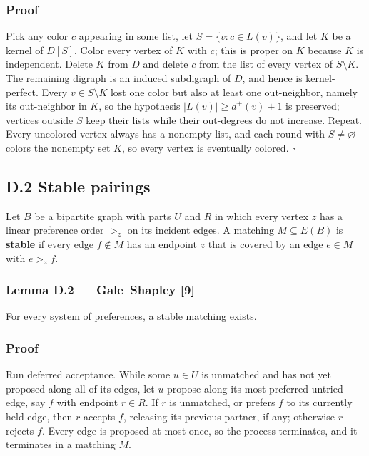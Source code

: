 \documentclass[english,11pt,a4paper]{article}
\newcounter{none}
\begin{document}
\subsubsection{Proof}\label{proof-9}

Pick any color \(c\) appearing in some list, let \(S=\{v:c\in L(v)\}\),
and let \(K\) be a kernel of \(D[S]\). Color every vertex of \(K\) with
\(c\); this is proper on \(K\) because \(K\) is independent. Delete
\(K\) from \(D\) and delete \(c\) from the list of every vertex of
\(S\setminus K\). The remaining digraph is an induced subdigraph of
\(D\), and hence is kernel-perfect. Every \(v\in S\setminus K\) lost one
color but also at least one out-neighbor, namely its out-neighbor in
\(K\), so the hypothesis \(|L(v)|\ge d^+(v)+1\) is preserved; vertices
outside \(S\) keep their lists while their out-degrees do not increase.
Repeat. Every uncolored vertex always has a nonempty list, and each
round with \(S\ne\varnothing\) colors the nonempty set \(K\), so every
vertex is eventually colored. \(\square\)

\subsection{D.2 Stable pairings}\label{d.2-stable-pairings}

Let \(B\) be a bipartite graph with parts \(U\) and \(R\) in which every
vertex \(z\) has a linear preference order \(>_z\) on its incident
edges. A matching \(M\subseteq E(B)\) is \textbf{stable} if every edge
\(f\notin M\) has an endpoint \(z\) that is covered by an edge
\(e\in M\) with \(e>_zf\).

\subsubsection{Lemma D.2 --- Gale--Shapley
{[}9{]}}\label{lemma-d.2-galeshapley-9}

For every system of preferences, a stable matching exists.

\subsubsection{Proof}\label{proof-10}

Run deferred acceptance. While some \(u\in U\) is unmatched and has not
yet proposed along all of its edges, let \(u\) propose along its most
preferred untried edge, say \(f\) with endpoint \(r\in R\). If \(r\) is
unmatched, or prefers \(f\) to its currently held edge, then \(r\)
accepts \(f\), releasing its previous partner, if any; otherwise \(r\)
rejects \(f\). Every edge is proposed at most once, so the process
terminates, and it terminates in a matching \(M\).
\end{document}
